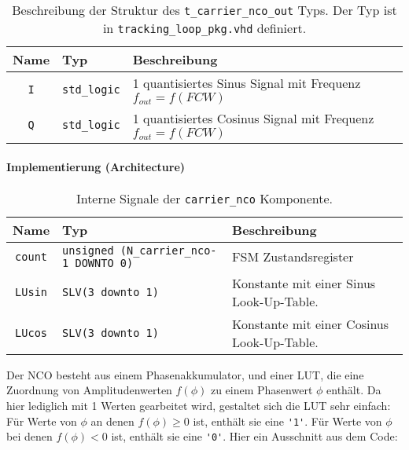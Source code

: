 \begin{table}[htbp]
    \ttabbox
    {
        \caption[Typdefinition Code NCO Ausgangssignal]{Beschreibung der Struktur des \lstinline$t_carrier_nco_out$ Typs. Der Typ ist in \lstinline$tracking_loop_pkg.vhd$ definiert.}
        \label{Tab_t_carrier_nco_out}
    }
    {
    \begin{tabular}{c  p{2cm} p{6cm}}
        \toprule
        Name				& Typ                   & Beschreibung \\
        \midrule
        \lstinline$I$		& \lstinline$std_logic$	& \SI{1}{\bit} quantisiertes Sinus Signal mit Frequenz $f_{out}=f(FCW)$\\
        \lstinline$Q$		& \lstinline$std_logic$	& \SI{1}{\bit} quantisiertes Cosinus Signal mit Frequenz $f_{out}=f(FCW)$ \\
        \bottomrule
    \end{tabular}
}
\end{table}

\paragraph{Implementierung (Architecture)}

\begin{table}[htbp]
    \ttabbox
    {
        \caption[Carrier NCO interne Signale]{Interne Signale der \lstinline$carrier_nco$ Komponente.}
        \label{TabCarrierNCO_ArchSignals}
    }
    {
    \begin{tabular}{c  p{2cm} p{6cm}}
        \toprule
        Name      & Typ         & Beschreibung \\
        \midrule
        \lstinline$count$  & \lstinline$unsigned (N_carrier_nco-1 DOWNTO 0)$             & \gls{FSM} Zustandsregister\\
        \lstinline$LUsin$  & \lstinline$SLV(3 downto 1)$ & Konstante mit einer Sinus Look-Up-Table.\\
        \lstinline$LUcos$  & \lstinline$SLV(3 downto 1)$ & Konstante mit einer Cosinus Look-Up-Table.\\
        \bottomrule
    \end{tabular}
}
\end{table}

Der NCO besteht aus einem Phasenakkumulator, und einer \gls{LUT}, die eine Zuordnung von Amplitudenwerten $f(\phi)$ zu einem Phasenwert $\phi$ enthält. Da hier lediglich mit \SI{1}{\bit} Werten gearbeitet wird, gestaltet sich die \gls{LUT} sehr einfach: Für Werte von $\phi$ an denen $f(\phi)\geq 0$ ist, enthält sie eine \lstinline$'1'$. Für Werte von $\phi$ bei denen $f(\phi)<0$ ist, enthält sie eine \lstinline$'0'$. Hier ein Ausschnitt aus dem Code:

